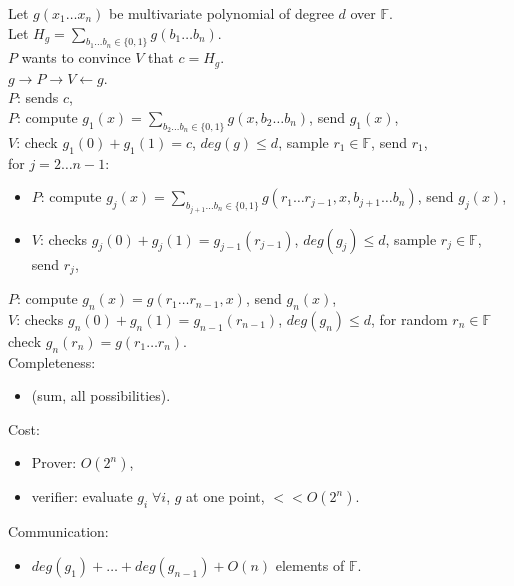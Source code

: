 \documentclass[a4paper, 12pt]{book}
\theoremstyle{definition}
\theoremstyle{remark}
\newcommand{\F}{\mathbb{F}}
\begin{document}
Let $g(x_1 \dots x_n)$ be multivariate polynomial of degree $d$ over $\F$. \\
Let $H_g = \sum_{b_1 \dots b_n \in \{0, 1\}} g(b_1 \dots b_n)$. \\
$P$ wants to convince $V$ that $c = H_g $. \\
$g \to P \to V \leftarrow g$. \\
$P$: sends $c$, \\
$P$: compute $g_1(x) = \sum_{b_2 \dots b_n \in \{0, 1\}} g(x, b_2 \dots b_n)$, send $g_1(x)$, \\
$V$: check $g_1(0) + g_1(1) = c$, $deg(g) \leq d$, sample $r_1 \in \F$, send $r_1$, \\
for $j = 2 \dots n-1$:
\begin{itemize}[label={}]
  \item $P$: compute $g_j(x) = \sum_{b_{j+1} \dots b_n \in \{0, 1\}} g(r_1 \dots r_{j-1}, x, b_{j+1} \dots b_n)$, send $g_j(x)$,
  \item $V$: checks $g_j(0) + g_j(1) = g_{j-1}(r_{j-1})$, $deg(g_j) \leq d$, sample $r_j \in \F$, send $r_j$,
\end{itemize}
$P$: compute $g_n(x) = g(r_1 \dots r_{n-1}, x)$, send $g_n(x)$, \\
$V$: checks $g_n(0) + g_n(1) = g_{n-1}(r_{n-1})$, $deg(g_n) \leq d$, 
for random $r_n \in \F$ check $g_n(r_n) = g(r_1 \dots r_n)$. \\
Completeness:
\begin{itemize}[label={}]
  \item \checkmark (sum, all possibilities).
\end{itemize}
Cost:
\begin{itemize}[label={}]
  \item Prover: $O\left(2^n\right)$,
  \item verifier: evaluate $g_i \; \forall i$, $g$ at one point, $<< O\left(2^n\right)$.
\end{itemize}
Communication:
\begin{itemize}[label={}]
  \item $deg(g_1) + \dots + deg(g_{n-1}) + O(n)$ elements of $\F$.
\end{itemize}


\end{document}
